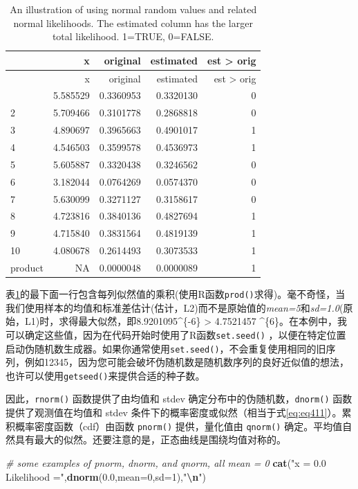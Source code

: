 \documentclass[
  lang=cn,
  11pt,
  scheme=chinese,
  chinesefont=nofont,
  citestyle=gb7714-2015,
  bibstyle=gb7714-2015]{elegantbook}
\newenvironment{Shaded}{\begin{snugshade}}{\end{snugshade}}
\newcommand{\AttributeTok}[1]{\textcolor[rgb]{0.13,0.29,0.53}{#1}}
\newcommand{\CommentTok}[1]{\textcolor[rgb]{0.56,0.35,0.01}{\textit{#1}}}
\newcommand{\DecValTok}[1]{\textcolor[rgb]{0.00,0.00,0.81}{#1}}
\newcommand{\FloatTok}[1]{\textcolor[rgb]{0.00,0.00,0.81}{#1}}
\newcommand{\FunctionTok}[1]{\textcolor[rgb]{0.13,0.29,0.53}{\textbf{#1}}}
\newcommand{\NormalTok}[1]{#1}
\newcommand{\SpecialCharTok}[1]{\textcolor[rgb]{0.81,0.36,0.00}{\textbf{#1}}}
\newcommand{\StringTok}[1]{\textcolor[rgb]{0.31,0.60,0.02}{#1}}
\begin{document}
\begin{longtable}[]{@{}lrrrr@{}}
\caption{\label{tab:tab41}An illustration of using normal random values and related normal likelihoods. The estimated column has the larger total likelihood. 1=TRUE, 0=FALSE.}\tabularnewline
\toprule\noalign{}
& x & original & estimated & est \textgreater{} orig \\
\midrule\noalign{}
\endfirsthead
\toprule\noalign{}
& x & original & estimated & est \textgreater{} orig \\
\midrule\noalign{}
\endhead
\bottomrule\noalign{}
\endlastfoot
1 & 5.585529 & 0.3360953 & 0.3320130 & 0 \\
2 & 5.709466 & 0.3101778 & 0.2868818 & 0 \\
3 & 4.890697 & 0.3965663 & 0.4901017 & 1 \\
4 & 4.546503 & 0.3599578 & 0.4536973 & 1 \\
5 & 5.605887 & 0.3320438 & 0.3246562 & 0 \\
6 & 3.182044 & 0.0764269 & 0.0574370 & 0 \\
7 & 5.630099 & 0.3271127 & 0.3158617 & 0 \\
8 & 4.723816 & 0.3840136 & 0.4827694 & 1 \\
9 & 4.715840 & 0.3831564 & 0.4819139 & 1 \\
10 & 4.080678 & 0.2614493 & 0.3073533 & 1 \\
product & NA & 0.0000048 & 0.0000089 & 1 \\
\end{longtable}

表\ref{tab:tab41}的最下面一行包含每列似然值的乘积(使用R函数\texttt{prod()}求得)。毫不奇怪，当我们使用样本的均值和标准差估计(估计，L2)而不是原始值的\emph{mean=5}和\emph{sd=1.0}(原始，L1)时，求得最大似然，即8.9201095\^{}\{-6\} \textgreater{} 4.7521457 \^{}\{6\}。在本例中，我可以确定这些值，因为在代码开始时使用了R函数\texttt{set.seed()} ，以便在特定位置启动伪随机数生成器。如果你通常使用\texttt{set.seed()}，不会重复使用相同的旧序列，例如12345，因为您可能会破坏伪随机数是随机数序列的良好近似值的想法，也许可以使用\texttt{getseed()}来提供合适的种子数。

因此，\texttt{rnorm()} 函数提供了由均值和 stdev 确定分布中的伪随机数，\texttt{dnorm()} 函数提供了观测值在均值和 stdev 条件下的概率密度或似然（相当于式\eqref{eq:eq411}）。累积概率密度函数（cdf）由函数 \texttt{pnorm()} 提供，量化值由 \texttt{qnorm()} 确定。平均值自然具有最大的似然。还要注意的是，正态曲线是围绕均值对称的。

\begin{Shaded}
\begin{Highlighting}[]
 \CommentTok{\# some examples of pnorm, dnorm, and qnorm, all mean = 0  }
\FunctionTok{cat}\NormalTok{(}\StringTok{"x = 0.0        Likelihood ="}\NormalTok{,}\FunctionTok{dnorm}\NormalTok{(}\FloatTok{0.0}\NormalTok{,}\AttributeTok{mean=}\DecValTok{0}\NormalTok{,}\AttributeTok{sd=}\DecValTok{1}\NormalTok{),}\StringTok{"}\SpecialCharTok{\textbackslash{}n}\StringTok{"}\NormalTok{)   }
\end{Highlighting}
\end{Shaded}
\end{document}
